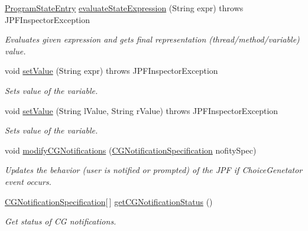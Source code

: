 \begin{DoxyCompactItemize}
\hyperlink{classgov_1_1nasa_1_1jpf_1_1inspector_1_1common_1_1pse_1_1_program_state_entry}{Program\+State\+Entry} \hyperlink{interfacegov_1_1nasa_1_1jpf_1_1inspector_1_1interfaces_1_1_program_state_interface_a3a64e61b42c7338fe4f90c9c8519177f}{evaluate\+State\+Expression} (String expr)  throws J\+P\+F\+Inspector\+Exception
\begin{DoxyCompactList}\small\item\em Evaluates given expression and gets final representation (thread/method/variable) value. \end{DoxyCompactList}\item 
void \hyperlink{interfacegov_1_1nasa_1_1jpf_1_1inspector_1_1interfaces_1_1_program_state_interface_aaf980401ba045fdd70af10cb1c956ee0}{set\+Value} (String expr)  throws J\+P\+F\+Inspector\+Exception
\begin{DoxyCompactList}\small\item\em Sets value of the variable. \end{DoxyCompactList}\item 
void \hyperlink{interfacegov_1_1nasa_1_1jpf_1_1inspector_1_1interfaces_1_1_program_state_interface_a992e2deda1c948e41ae9abcc776eec7b}{set\+Value} (String l\+Value, String r\+Value)  throws J\+P\+F\+Inspector\+Exception
\begin{DoxyCompactList}\small\item\em Sets value of the variable. \end{DoxyCompactList}\item 
void \hyperlink{interfacegov_1_1nasa_1_1jpf_1_1inspector_1_1interfaces_1_1_choice_generators_interface_a7c85aa8be525bc12e0fcacfbdb7e3094}{modify\+C\+G\+Notifications} (\hyperlink{classgov_1_1nasa_1_1jpf_1_1inspector_1_1interfaces_1_1_choice_generators_interface_1_1_c_g_notification_specification}{C\+G\+Notification\+Specification} nofity\+Spec)
\begin{DoxyCompactList}\small\item\em Updates the behavior (user is notified or prompted) of the J\+PF if Choice\+Genetator event occurs. \end{DoxyCompactList}\item 
\hyperlink{classgov_1_1nasa_1_1jpf_1_1inspector_1_1interfaces_1_1_choice_generators_interface_1_1_c_g_notification_specification}{C\+G\+Notification\+Specification}\mbox{[}$\,$\mbox{]} \hyperlink{interfacegov_1_1nasa_1_1jpf_1_1inspector_1_1interfaces_1_1_choice_generators_interface_a50be99532b75699fd9b5b24b38bd27ca}{get\+C\+G\+Notification\+Status} ()
\begin{DoxyCompactList}\small\item\em Get status of CG notifications. \end{DoxyCompactList}\item 

\end{DoxyCompactItemize}
